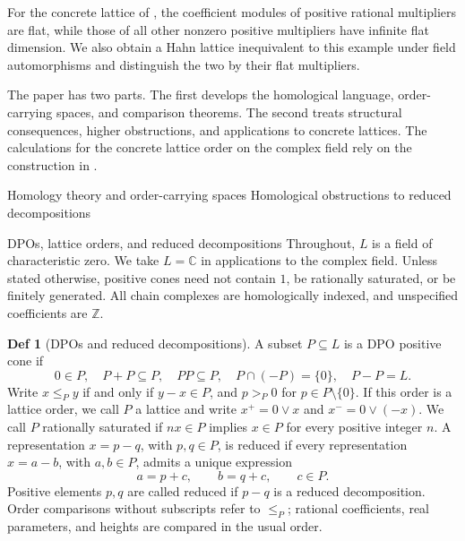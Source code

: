 \documentclass[10pt,letterpaper]{amsart}
\makeatletter
\numberwithin{equation}{section}
\theoremstyle{definition}
\newtheorem{defn}{Def}[section]
\newcommand{\Z}{\mathbb Z}
\newcommand{\C}{\mathbb C}
\def\part{\@startsection{part}{0}
  \z@{1.3\linespacing\@plus.5\linespacing}{.7\linespacing}
  {\normalfont\fontsize{14}{18}\selectfont\bfseries\boldmath\raggedright}}
\def\section{\@startsection{section}{1}
  \z@{1.1\linespacing\@plus.5\linespacing}{.6\linespacing}
  {\normalfont\fontsize{13}{16}\selectfont\bfseries\boldmath\centering}}
\def\subsection{\@startsection{subsection}{2}
  \z@{.9\linespacing\@plus.3\linespacing}{.4\linespacing}
  {\normalfont\fontsize{11.5}{14}\selectfont\bfseries\boldmath\raggedright}}
\makeatother
\begin{document}
For the concrete lattice of \cite{BY}, the coefficient modules of positive rational multipliers are flat, while those of all other nonzero positive multipliers have infinite flat dimension. We also obtain a Hahn lattice inequivalent to this example under field automorphisms and distinguish the two by their flat multipliers.

The paper has two parts. The first develops the homological language, order-carrying spaces, and comparison theorems. The second treats structural consequences, higher obstructions, and applications to concrete lattices. The calculations for the concrete lattice order on the complex field rely on the construction in \cite{BY}.

\part{Homology theory and order-carrying spaces}
\section{Homological obstructions to reduced decompositions}
\subsection{DPOs, lattice orders, and reduced decompositions}
Throughout, $L$ is a field of characteristic zero. We take $L=\C$ in applications to the complex field. Unless stated otherwise, positive cones need not contain $1$, be rationally saturated, or be finitely generated. All chain complexes are homologically indexed, and unspecified coefficients are $\Z$.

\begin{defn}[DPOs and reduced decompositions]\label{def:dpo}
A subset $P\subseteq L$ is a DPO positive cone if
\[
0\in P,\quad P+P\subseteq P,\quad PP\subseteq P,\quad
P\cap(-P)=\{0\},\quad P-P=L.
\]
Write $x\le_P y$ if and only if $y-x\in P$, and $p>_P0$ for $p\in P\setminus\{0\}$.
If this order is a lattice order, we call $P$ a lattice and write $x^+=0\vee x$ and $x^-=0\vee(-x)$. We call $P$ rationally saturated if $nx\in P$ implies $x\in P$ for every positive integer $n$.
A representation $x=p-q$, with $p,q\in P$, is reduced if every representation $x=a-b$, with $a,b\in P$, admits a unique expression
\[
a=p+c,\qquad b=q+c,\qquad c\in P.
\]
Positive elements $p,q$ are called reduced if $p-q$ is a reduced decomposition. Order comparisons without subscripts refer to $\le_P$; rational coefficients, real parameters, and heights are compared in the usual order.
\end{defn}
\end{document}
